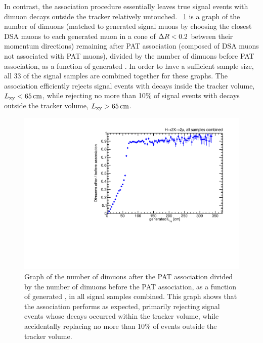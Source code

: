 In contrast, the association procedure essentially leaves true signal events with dimuon decays outside the tracker relatively untouched.
\Fig~\ref{fig:dd:REPEFF_Signal_Lxy} is a graph of the number of dimuons (matched to generated signal muons by choosing the closest DSA muons to each generated muon in a cone of $\Delta R < 0.2$ between their momentum directions) remaining after PAT association (\ie composed of DSA muons not associated with PAT muons), divided by the number of dimuons before PAT association, as a function of generated \Lxy.
In order to have a sufficient sample size, all 33 of the \twoMu signal samples are combined together for these graphs.
The association efficiently rejects signal events with decays inside the tracker volume, $L_{\mathrm{xy}} < 65\,\text{cm}$, while rejecting no more than 10\% of signal events with decays outside the tracker volume, $L_{\mathrm{xy}} > 65\,\text{cm}$.
\begin{figure}[htpb]
  \centering
  \includegraphics[width=\DFigWidth]{figures/displaced/REPEFF_Signal_Global.pdf}
  \caption[Graph of the number of dimuons after the PAT association divided by the number of dimuons before the PAT association, as a function of generated \Lxy, in all \twoMu signal samples combined.]{Graph of the number of dimuons after the PAT association divided by the number of dimuons before the PAT association, as a function of generated \Lxy, in all \twoMu signal samples combined. This graph shows that the association performs as expected, primarily rejecting signal events whose decays occurred within the tracker volume, while accidentally replacing no more than 10\% of events outside the tracker volume.}
  \label{fig:dd:REPEFF_Signal_Lxy}
\end{figure}


